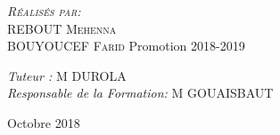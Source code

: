 \documentclass[12pt, a4paper, openany]{report}
\begin{document}
\begin{titlepage}
\begin{sffamily}
\begin{center}
    \begin{minipage}{0.4\textwidth}
      \begin{flushleft} \large
         \textsc{\emph {Réalisés par:} \\REBOUT Mehenna}\\
         \textsc{BOUYOUCEF Farid}   
          \newline
          Promotion 2018-2019 \\
      \end{flushleft}
    \end{minipage}
    \begin{minipage}{0.4\textwidth}
      \begin{flushright} \large
        \emph{Tuteur :}  \textsc{M DUROLA}\\
        \emph{Responsable de la Formation:} \textsc{M GOUAISBAUT}
      \end{flushright}
    \end{minipage}

    \vfill

    {\large Octobre 2018}

  \end{center}
  \end{sffamily}      
          
  \end{titlepage}
  
\makeatother




   
\renewcommand{\contentsname}{Sommaire}
\tableofcontents
\listoffigures
\listoftables
 
 
 
 
 
 
 
 
\end{document}
